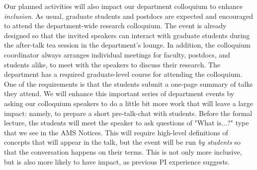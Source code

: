 \documentclass[11pt]{NSFamsart}
\begin{document}
Our planned activities will also impact our department colloquium to enhance \emph{inclusion}. 
As usual, graduate students and postdocs are expected and encouraged to attend the department-wide research colloquium. The event is already designed so that the invited speakers can interact with graduate students during the after-talk tea session in the department's lounge. In addition, the colloquium coordinator always 
arranges individual meetings for faculty, postdocs, and students alike, %
to meet with the speakers to discuss their research.  The department has a required graduate-level course for attending the colloquium. One of the requirements is that the students submit a one-page summary of talks they attend. 
We will enhance this important series of department events by asking our colloquium speakers to do a little bit more work that will leave a large impact: namely, to prepare a short pre-talk-chat with students. Before the formal lecture, the students will meet the speaker to ask questions of "What is...?" type that we see in the AMS Notices. This will require high-level definitions of concepts that will appear in the talk, but the event will be run \emph{by students} so that the conversation happens on their terms. This is not only more inclusive, but is also more likely to have impact, as previous PI experience suggests.  
\end{document}
